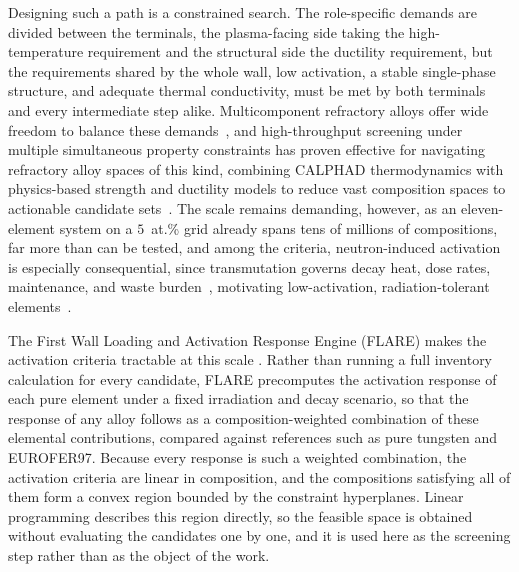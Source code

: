 Designing such a path is a constrained search. The role-specific demands are
divided between the terminals, the plasma-facing side taking the
high-temperature requirement and the structural side the ductility
requirement, but the requirements shared by the whole wall, low activation, a
stable single-phase structure, and adequate thermal conductivity, must be met
by both terminals and every intermediate step alike. Multicomponent
refractory alloys offer wide freedom to balance these
demands~\cite{HEAnuclear2021,Senkov2010}, and high-throughput screening under
multiple simultaneous property constraints has proven effective for
navigating refractory alloy spaces of this kind, combining CALPHAD
thermodynamics with physics-based strength and ductility models to reduce
vast composition spaces to actionable candidate
sets~\cite{vela2023data,HTcalphad2022}. The scale remains demanding, however,
as an eleven-element system on a \(5\)~at.\% grid already spans tens of
millions of compositions, far more than can be tested, and among the
criteria, neutron-induced activation is especially consequential, since
transmutation governs decay heat, dose rates, maintenance, and waste
burden~\cite{RAFMreview2017}, motivating low-activation, radiation-tolerant
elements~\cite{HEAnuclear2021,ElAtwani2019Radiation}.

The First Wall Loading and Activation Response Engine (FLARE) makes the
activation criteria tractable at this scale
\textcolor{red}{\cite{flare}}. Rather than running a full inventory
calculation for every candidate, FLARE precomputes the activation response of
each pure element under a fixed irradiation and decay scenario, so that the
response of any alloy follows as a composition-weighted combination of these
elemental contributions, compared against references such as pure tungsten
and EUROFER97. Because every response is such a weighted combination, the
activation criteria are linear in composition, and the compositions
satisfying all of them form a convex region bounded by the constraint
hyperplanes. Linear programming describes this region directly, so the
feasible space is obtained without evaluating the candidates one by one, and
it is used here as the screening step rather than as the object of the work.

